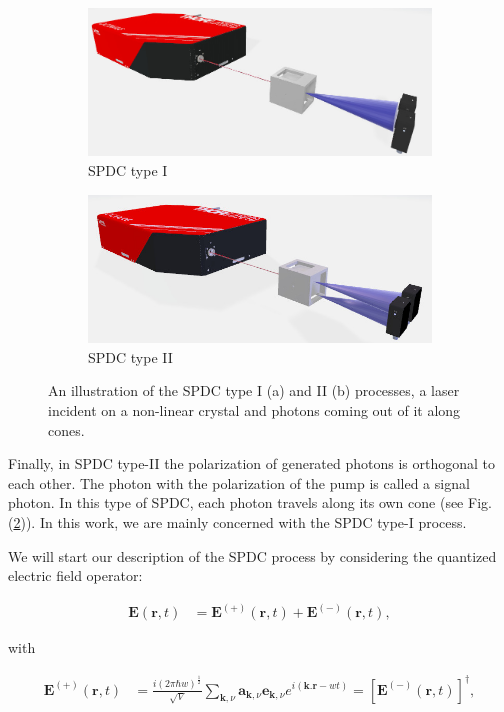 \documentclass[12pt]{book}
\begin{document}
\begin{figure}[t!]
\centering
\begin{subfigure}[b]{0.45\linewidth}
\includegraphics[width=\linewidth,height=2.8 cm]{images/TypeI.jpg}
\caption{SPDC type I}
\label{fig:type1}
\end{subfigure}
\begin{subfigure}[b]{0.45\linewidth}
\includegraphics[width=\linewidth,height=2.8 cm]{images/typeII.jpg}
\caption{SPDC type II}
\label{fig:type2}
\end{subfigure}
\caption{An illustration of the SPDC type I (a) and II (b) processes, a laser incident on a non-linear crystal and photons coming out of it along cones.}
\label{fig:SPDC}
\end{figure}


Finally, in SPDC type-II the polarization of generated photons is orthogonal to each other. The photon with the polarization of the pump is called a signal photon. In this type of SPDC, each photon travels along its own cone (see Fig. (\ref{fig:type2})). In this work, we are mainly concerned with the SPDC type-I process.

We will start our description of the SPDC process by considering the quantized electric field operator:

\begin{align}
\textbf{E}(\textbf{r},t)&=\textbf{E}^{(+)} (\textbf{r},t) + \textbf{E}^{(-)} (\textbf{r},t), \label{fiel+}
\end{align}

with

\begin{align}
\textbf{E}^{(+)} (\textbf{r},t)&=\frac{i(2 \pi \hbar w)^{\frac{1}{2}}}{\sqrt{V}} \sum_{\textbf{k},\nu}  \mathbf{a}_{\textbf{k},\nu} \mathbf{e}_{\textbf{k},\nu} e^{i(\textbf{k.r}-wt)}=[\textbf{E}^{(-)} (\textbf{r},t)]^{\dagger}, \label{quanfield}
\end{align}
\end{document}
